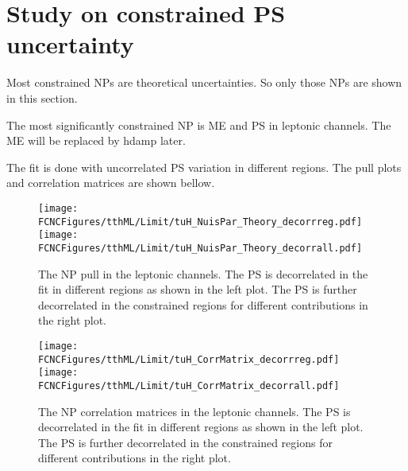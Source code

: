 \section{Study on constrained PS uncertainty}
Most constrained NPs are theoretical uncertainties. So only those NPs are shown in this section.

The most significantly constrained NP is ME and PS in leptonic channels. The ME will be replaced by hdamp later.

The fit is done with uncorrelated PS variation in different regions. The pull plots and correlation matrices are shown bellow.

\begin{figure}[H]
\centering
\texttt{[image: \\FCNCFigures/tthML/Limit/tuH\_NuisPar\_Theory\_decorrreg.pdf]}
\texttt{[image: \\FCNCFigures/tthML/Limit/tuH\_NuisPar\_Theory\_decorrall.pdf]}
\caption{ The NP pull in the leptonic channels. The PS is decorrelated in the fit in different regions as shown in the left plot. The PS is further decorrelated in the constrained regions for different contributions in the right plot. }
\label{fig:tuH_NuisPar_decorr}
\end{figure}


\begin{figure}[H]
\centering
\texttt{[image: \\FCNCFigures/tthML/Limit/tuH\_CorrMatrix\_decorrreg.pdf]}
\texttt{[image: \\FCNCFigures/tthML/Limit/tuH\_CorrMatrix\_decorrall.pdf]}
\caption{ The NP correlation matrices in the leptonic channels. The PS is decorrelated in the fit in different regions as shown in the left plot. The PS is further decorrelated in the constrained regions for different contributions in the right plot. }
\label{fig:tuH_CorrMatrix_decorr}
\end{figure}
